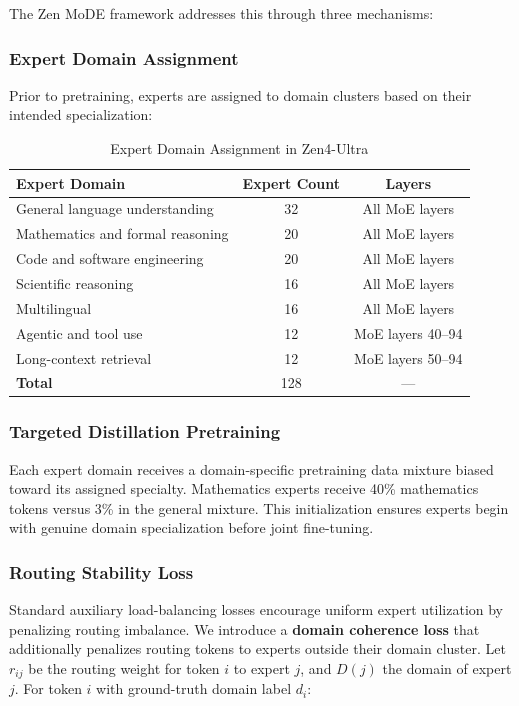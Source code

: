 \documentclass[11pt,a4paper]{article}
\begin{document}
The Zen MoDE framework addresses this through three mechanisms:

\subsubsection{Expert Domain Assignment}

Prior to pretraining, experts are assigned to domain clusters based on their intended
specialization:

\begin{table}[H]
\centering
\begin{tabular}{lcc}
\toprule
\textbf{Expert Domain} & \textbf{Expert Count} & \textbf{Layers} \\
\midrule
General language understanding & 32 & All MoE layers \\
Mathematics and formal reasoning & 20 & All MoE layers \\
Code and software engineering  & 20 & All MoE layers \\
Scientific reasoning           & 16 & All MoE layers \\
Multilingual                   & 16 & All MoE layers \\
Agentic and tool use           & 12 & MoE layers 40--94 \\
Long-context retrieval         & 12 & MoE layers 50--94 \\
\midrule
\textbf{Total}                 & 128 & --- \\
\bottomrule
\end{tabular}
\caption{Expert Domain Assignment in Zen4-Ultra}
\end{table}

\subsubsection{Targeted Distillation Pretraining}

Each expert domain receives a domain-specific pretraining data mixture biased toward
its assigned specialty. Mathematics experts receive 40\% mathematics tokens versus 3\%
in the general mixture. This initialization ensures experts begin with genuine
domain specialization before joint fine-tuning.

\subsubsection{Routing Stability Loss}

Standard auxiliary load-balancing losses encourage uniform expert utilization by penalizing
routing imbalance. We introduce a \textbf{domain coherence loss} that additionally penalizes
routing tokens to experts outside their domain cluster. Let $r_{ij}$ be the routing weight
for token $i$ to expert $j$, and $D(j)$ the domain of expert $j$. For token $i$ with
ground-truth domain label $d_i$:
\end{document}
